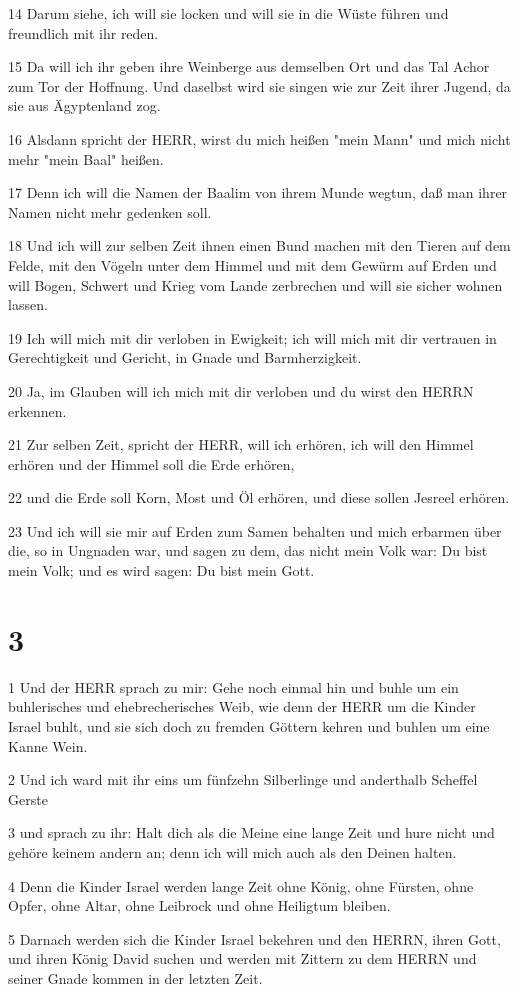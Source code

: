 \par 14 Darum siehe, ich will sie locken und will sie in die Wüste führen und freundlich mit ihr reden.
\par 15 Da will ich ihr geben ihre Weinberge aus demselben Ort und das Tal Achor zum Tor der Hoffnung. Und daselbst wird sie singen wie zur Zeit ihrer Jugend, da sie aus Ägyptenland zog.
\par 16 Alsdann spricht der HERR, wirst du mich heißen "mein Mann" und mich nicht mehr "mein Baal" heißen.
\par 17 Denn ich will die Namen der Baalim von ihrem Munde wegtun, daß man ihrer Namen nicht mehr gedenken soll.
\par 18 Und ich will zur selben Zeit ihnen einen Bund machen mit den Tieren auf dem Felde, mit den Vögeln unter dem Himmel und mit dem Gewürm auf Erden und will Bogen, Schwert und Krieg vom Lande zerbrechen und will sie sicher wohnen lassen.
\par 19 Ich will mich mit dir verloben in Ewigkeit; ich will mich mit dir vertrauen in Gerechtigkeit und Gericht, in Gnade und Barmherzigkeit.
\par 20 Ja, im Glauben will ich mich mit dir verloben und du wirst den HERRN erkennen.
\par 21 Zur selben Zeit, spricht der HERR, will ich erhören, ich will den Himmel erhören und der Himmel soll die Erde erhören,
\par 22 und die Erde soll Korn, Most und Öl erhören, und diese sollen Jesreel erhören.
\par 23 Und ich will sie mir auf Erden zum Samen behalten und mich erbarmen über die, so in Ungnaden war, und sagen zu dem, das nicht mein Volk war: Du bist mein Volk; und es wird sagen: Du bist mein Gott.

\chapter{3}

\par 1 Und der HERR sprach zu mir: Gehe noch einmal hin und buhle um ein buhlerisches und ehebrecherisches Weib, wie denn der HERR um die Kinder Israel buhlt, und sie sich doch zu fremden Göttern kehren und buhlen um eine Kanne Wein.
\par 2 Und ich ward mit ihr eins um fünfzehn Silberlinge und anderthalb Scheffel Gerste
\par 3 und sprach zu ihr: Halt dich als die Meine eine lange Zeit und hure nicht und gehöre keinem andern an; denn ich will mich auch als den Deinen halten.
\par 4 Denn die Kinder Israel werden lange Zeit ohne König, ohne Fürsten, ohne Opfer, ohne Altar, ohne Leibrock und ohne Heiligtum bleiben.
\par 5 Darnach werden sich die Kinder Israel bekehren und den HERRN, ihren Gott, und ihren König David suchen und werden mit Zittern zu dem HERRN und seiner Gnade kommen in der letzten Zeit.

